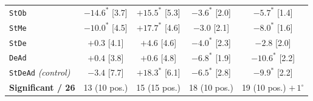\begin{table}[t]
\begin{tabular}{lcccc}
\texttt{StOb} & $-14.6^{\ast}$ {\scriptsize[3.7]} & $+15.5^{\ast}$ {\scriptsize[5.3]} & $-3.6^{\ast}$ {\scriptsize[2.0]} & $-5.7^{\ast}$ {\scriptsize[1.4]}\\
\texttt{StMe} & $-10.0^{\ast}$ {\scriptsize[4.5]} & $+17.7^{\ast}$ {\scriptsize[4.6]} & $-3.0$ {\scriptsize[2.1]} & $-8.0^{\ast}$ {\scriptsize[1.6]}\\
\texttt{StDe} & $+0.3$ {\scriptsize[4.1]} & $+4.6$ {\scriptsize[4.6]} & $-4.0^{\ast}$ {\scriptsize[2.3]} & $-2.8$ {\scriptsize[2.0]}\\
\texttt{DeAd} & $+0.4$ {\scriptsize[3.8]} & $+0.6$ {\scriptsize[4.8]} & $-6.8^{\ast}$ {\scriptsize[1.9]} & $-10.6^{\ast}$ {\scriptsize[2.2]}\\
\rowcolor{gray!12}\texttt{StDeAd} \emph{(control)} & $-3.4$ {\scriptsize[7.7]} & $+18.3^{\ast}$ {\scriptsize[6.1]} & $-6.5^{\ast}$ {\scriptsize[2.8]} & $-9.9^{\ast}$ {\scriptsize[2.2]}\\
\midrule
\textbf{Significant / 26} & 13 (10 pos.) & 15 (15 pos.) & 18 (10 pos.) & 19 (10 pos.) $+\,1^{\circ}$\\
\bottomrule
\end{tabular}
\end{table}
